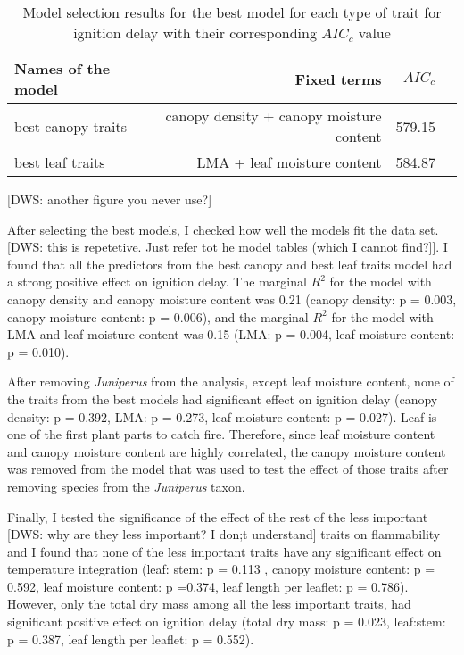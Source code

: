 \documentclass[12pt]{report}
\begin{document}
\begin{table}
\centering
\begin{tabular}{lrrr}
       \hline
       \textbf{ Names of the model} & \textbf{Fixed terms} & \textbf{$AIC_{c}$} \\
       \hline
        best canopy traits  & canopy density +  canopy moisture content &  579.15 \\
       \hline
        best leaf traits    & LMA +  leaf moisture content &  584.87 \\
       \hline
\end{tabular}
\caption{Model selection results for the best model for each type of trait for ignition delay with their corresponding $AIC_{c}$ value}
\end{table}

[DWS: another figure you never use?]


After selecting the best models, I checked how well the models fit the data set.  [DWS: this is repetetive. Just refer tot he model tables (which I cannot find?]]. I found that all the predictors from the best canopy and best leaf traits model had a strong positive effect on ignition delay. The marginal $R^2$ for the model with canopy density and canopy moisture content was 0.21 (canopy density: p = 0.003, canopy moisture content: p = 0.006), and the marginal $R^2$ for the model with LMA and leaf moisture content was 0.15 (LMA: p = 0.004, leaf moisture content: p = 0.010). \

After removing \emph{Juniperus} from the analysis, except leaf moisture content, none of the traits from the best models had significant effect on ignition delay (canopy density: p = 0.392,
LMA: p = 0.273, leaf moisture content: p = 0.027). Leaf is one of the first plant parts to catch fire.
Therefore, since leaf moisture content and canopy moisture content are highly correlated, the canopy moisture content was removed from the model that was used to test the effect of those traits after removing species from the \emph{Juniperus} taxon.



Finally, I tested the significance of the effect of the rest of the less important [DWS: why are they less important? I don;t understand] traits on flammability and I found that none of the less important traits have any significant effect on temperature integration (leaf: stem: p = 0.113 , canopy moisture content: p = 0.592, leaf moisture content: p =0.374, leaf length per leaflet: p = 0.786). However, only the total dry mass among all the less important traits, had significant positive effect on ignition delay (total dry mass: p = 0.023, leaf:stem: p = 0.387, leaf length per leaflet: p = 0.552).
\end{document}
